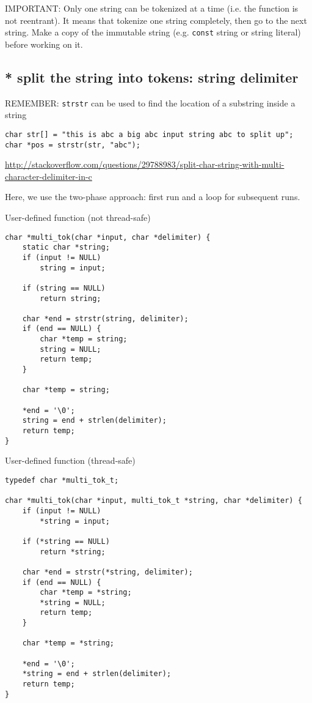 IMPORTANT: Only one string can be tokenized at a time (i.e. the function is not
reentrant). It means that tokenize one string completely, then go to the next
string. Make a copy of the immutable string (e.g. \verb!const! string or string
literal) before working on it.



\subsection{* split the string into tokens: string delimiter}

REMEMBER: \verb!strstr! can be used to find the location of a substring inside a
string
\begin{verbatim}
char str[] = "this is abc a big abc input string abc to split up";
char *pos = strstr(str, "abc");
\end{verbatim}
\url{http://stackoverflow.com/questions/29788983/split-char-string-with-multi-character-delimiter-in-c}

Here, we use the two-phase approach: first run and a loop for subsequent runs.

User-defined function  (not thread-safe)
\begin{lstlisting}
char *multi_tok(char *input, char *delimiter) {
    static char *string;
    if (input != NULL)
        string = input;

    if (string == NULL)
        return string;

    char *end = strstr(string, delimiter);
    if (end == NULL) {
        char *temp = string;
        string = NULL;
        return temp;
    }

    char *temp = string;

    *end = '\0';
    string = end + strlen(delimiter);
    return temp;
}
\end{lstlisting}


User-defined function (thread-safe)
\begin{lstlisting}
typedef char *multi_tok_t;

char *multi_tok(char *input, multi_tok_t *string, char *delimiter) {
    if (input != NULL)
        *string = input;

    if (*string == NULL)
        return *string;

    char *end = strstr(*string, delimiter);
    if (end == NULL) {
        char *temp = *string;
        *string = NULL;
        return temp;
    }

    char *temp = *string;

    *end = '\0';
    *string = end + strlen(delimiter);
    return temp;
}
\end{lstlisting}

